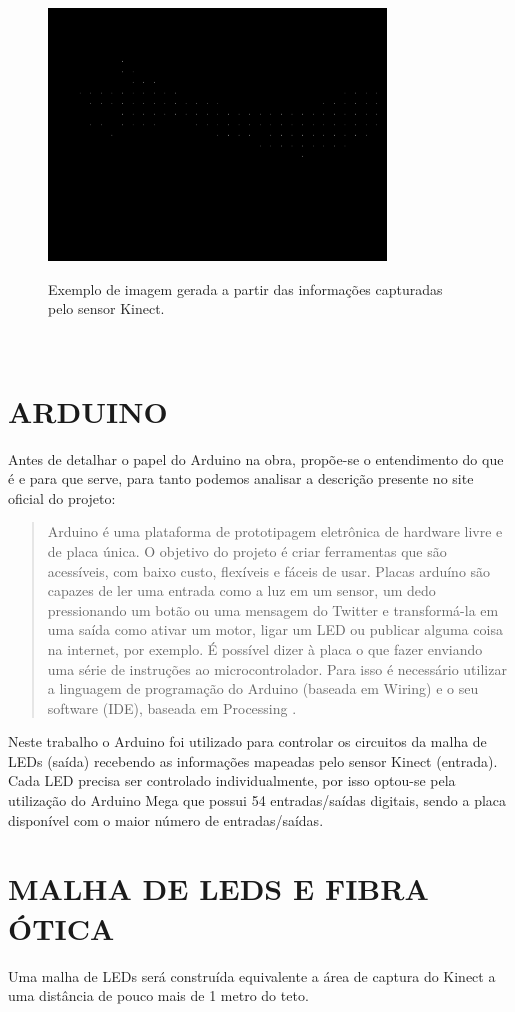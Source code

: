 \begin{figure}[H]
    \centering
    \caption{Exemplo de imagem gerada a partir  das informações capturadas  pelo sensor Kinect.}
	\vspace*{0,2cm}
    \includegraphics[width=0.8\textwidth]{./04-figuras/kinect_exemplo}
    \label{fig:kinect_exemplo}
\end{figure}
\vspace*{-0,9cm}
{\raggedright {}}\\


\section{ARDUINO}

Antes de detalhar o papel do Arduino na obra, propõe-se o entendimento do que é e para que serve, para tanto podemos analisar a descrição presente no site oficial do projeto:

\begin{quotation}
Arduino é uma plataforma de prototipagem eletrônica de hardware livre e de placa única. O objetivo do projeto é criar ferramentas que são acessíveis, com baixo custo, flexíveis e fáceis de usar. Placas arduíno são capazes de ler uma entrada como a luz em um sensor, um dedo pressionando um botão ou uma mensagem do Twitter e transformá-la em uma saída como ativar um motor, ligar um LED ou publicar alguma coisa na internet, por exemplo. É possível dizer à placa o que fazer enviando uma série de instruções ao microcontrolador. Para isso é necessário utilizar a linguagem de programação do Arduino (baseada em Wiring) e o seu software (IDE), baseada em Processing \cite{arduino}. 
\end{quotation}

Neste trabalho o Arduino foi utilizado para controlar os circuitos da malha de LEDs (saída) recebendo as informações mapeadas pelo sensor Kinect (entrada). Cada LED precisa ser controlado individualmente, por isso optou-se pela utilização do Arduino Mega que possui 54 entradas/saídas digitais, sendo a placa disponível com o maior número de entradas/saídas.


\section{MALHA DE LEDS E FIBRA ÓTICA}

Uma malha de LEDs será construída equivalente a área de captura do Kinect a uma distância de pouco mais de 1 metro do teto.
